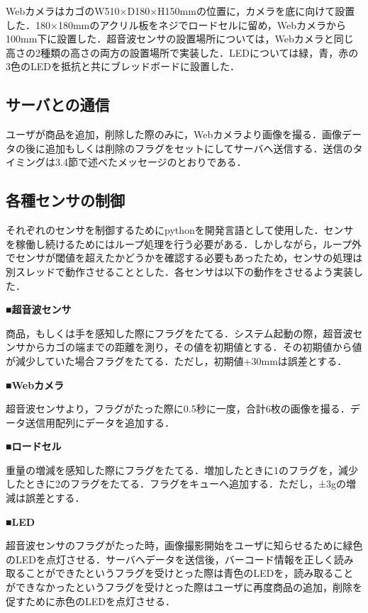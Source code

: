 WebカメラはカゴのW510×D180×H150mmの位置に，カメラを底に向けて設置した．180×180mmのアクリル板をネジでロードセルに留め，Webカメラから100mm下に設置した．超音波センサの設置場所については，Webカメラと同じ高さの2種類の高さの両方の設置場所で実装した．LEDについては緑，青，赤の3色のLEDを抵抗と共にブレッドボードに設置した．

\subsection*{サーバとの通信}

ユーザが商品を追加，削除した際のみに，Webカメラより画像を撮る．画像データの後に追加もしくは削除のフラグをセットにしてサーバへ送信する．送信のタイミングは3.4節で述べたメッセージのとおりである．

\subsection*{各種センサの制御}

それぞれのセンサを制御するためにpythonを開発言語として使用した．センサを稼働し続けるためにはループ処理を行う必要がある．しかしながら，ループ外でセンサが閾値を超えたかどうかを確認する必要もあったため，センサの処理は別スレッドで動作させることとした．各センサは以下の動作をさせるよう実装した．

\noindent
{\bf ■超音波センサ}

商品，もしくは手を感知した際にフラグをたてる．システム起動の際，超音波センサからカゴの端までの距離を測り，その値を初期値とする．その初期値から値が減少していた場合フラグをたてる．ただし，初期値+30mmは誤差とする．

\noindent
{\bf ■Webカメラ}

超音波センサより，フラグがたった際に0.5秒に一度，合計6枚の画像を撮る．データ送信用配列にデータを追加する．

\noindent
{\bf ■ロードセル}

重量の増減を感知した際にフラグをたてる．増加したときに1のフラグを，減少したときに2のフラグをたてる．フラグをキューへ追加する．ただし，±3gの増減は誤差とする．

\noindent
{\bf ■LED}

超音波センサのフラグがたった時，画像撮影開始をユーザに知らせるために緑色のLEDを点灯させる．サーバへデータを送信後，バーコード情報を正しく読み取ることができたというフラグを受けとった際は青色のLEDを，読み取ることができなかったというフラグを受けとった際はユーザに再度商品の追加，削除を促すために赤色のLEDを点灯させる．

\newpage


